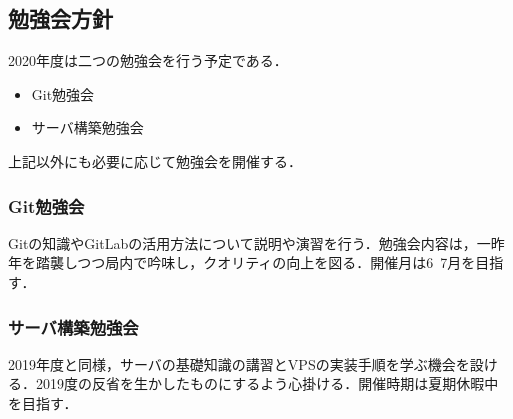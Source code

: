 \subsection*{勉強会方針}


2020年度は二つの勉強会を行う予定である．
 \begin{itemize}
\item Git勉強会
\item サーバ構築勉強会
 \end{itemize}
上記以外にも必要に応じて勉強会を開催する．

\subsubsection*{Git勉強会}
Gitの知識やGitLabの活用方法について説明や演習を行う．勉強会内容は，一昨年を踏襲しつつ局内で吟味し，クオリティの向上を図る．開催月は6~7月を目指す．
\subsubsection*{サーバ構築勉強会}
2019年度と同様，サーバの基礎知識の講習とVPSの実装手順を学ぶ機会を設ける．2019度の反省を生かしたものにするよう心掛ける．開催時期は夏期休暇中を目指す．


